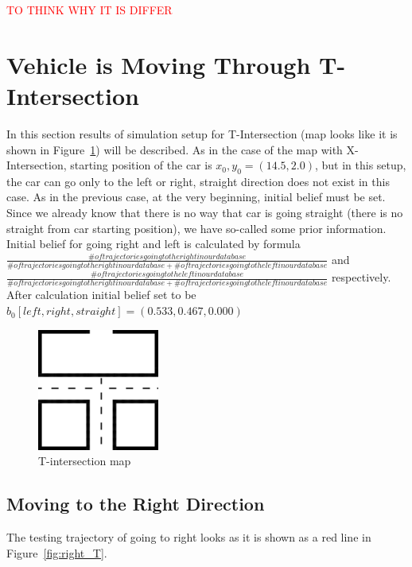 \textcolor{red}{TO THINK WHY IT IS DIFFER}


\section{Vehicle is Moving Through T-Intersection}

In this section results of simulation setup for T-Intersection (map looks like it is shown in Figure~\ref{fig:Tint}) will be described. As in the case of the map with X-Intersection, starting position of the car is $x_0,y_0 = (14.5, 2.0)$, but in this setup, the car can go only to the left or right, straight direction does not exist in this case. As in the previous case, at the very beginning, initial belief must be set. Since we already know that there is no way that car is going straight (there is no straight from car starting position), we have so-called some prior information. Initial belief for going right and left is calculated by formula $\frac{\# of trajectories going to the right in our database}{\# of trajectories going to the right in our database + \# of trajectories going to the left in our database}$ and $\frac{\# of trajectories going to the left in our database}{\# of trajectories going to the right in our database + \# of trajectories going to the left in our database}$ respectively. After calculation initial belief set to be $b_0 [left, right, straight]= (0.533, 0.467, 0.000)$

\begin{figure}[h]
	\centering  	
	\includegraphics[width=4cm]{img/T-int.jpg}
	\caption{T-intersection map}
	\label{fig:Tint}    
\end{figure}

\subsection{Moving to the Right Direction}

The testing trajectory of going to right looks as it is shown as a red line in Figure~\ref{fig:right_T}.

